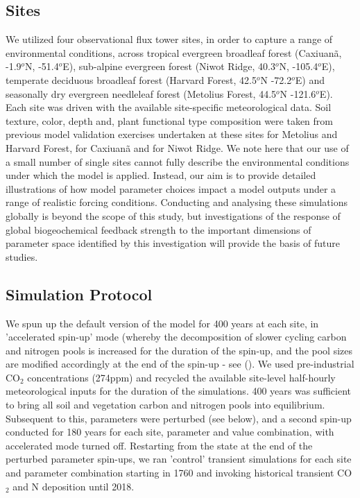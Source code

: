 \usepackage{}\documentclass[draft,linenumbers]{agujournal}
\begin{document}
\subsection{Sites}
We utilized four observational flux tower sites, in order to capture a range of environmental conditions, across tropical evergreen broadleaf forest (Caxiuan\~a, -1.9$^{o}$N, -51.4$^{o}$E),  sub-alpine evergreen forest (Niwot Ridge, 40.3$^{o}$N, -105.4$^{o}$E), temperate deciduous broadleaf forest (Harvard Forest, 42.5$^{o}$N -72.2$^{o}$E) and seasonally dry evergreen needleleaf forest (Metolius Forest, 44.5$^{o}$N -121.6$^{o}$E).  Each site was driven with the available site-specific meteorological data. Soil texture, color, depth and, plant functional type composition were taken from previous model validation exercises undertaken at these sites \cite{bonan2012} for Metolius and Harvard Forest, \cite{fisher2007} for Caxiuan\~a and \cite{bonan2013} for Niwot Ridge.   We note here that our use of a small number of single sites cannot fully describe the environmental conditions under which the model is applied. Instead, our aim is to provide detailed illustrations of how model parameter choices impact a model outputs under a range of realistic forcing conditions. Conducting and analysing these simulations globally is beyond the scope of this study, but investigations of the response of global biogeochemical feedback strength to the important dimensions of parameter space identified by this investigation will provide the basis of future studies. 

\subsection{Simulation Protocol}
We spun up the default version of the model for 400 years at each site, in 'accelerated spin-up' mode (whereby the decomposition of slower cycling carbon and nitrogen pools is increased for the duration of the spin-up, and the pool sizes are modified accordingly at the end of the spin-up - see (\cite{lawrence2018}). We used pre-industrial CO$_{2}$ concentrations (274ppm) and recycled the available site-level half-hourly meteorological inputs for the duration of the simulations. 400 years was sufficient to bring all soil and vegetation carbon and nitrogen pools into equilibrium. Subsequent to this, parameters were perturbed (see below), and a second spin-up conducted for 180 years for each site, parameter and value combination, with accelerated mode turned off. Restarting from the state at the end of the perturbed parameter spin-ups, we ran 'control' transient simulations for each site and parameter combination starting in 1760 and invoking historical transient CO$_{2}$ and N deposition until 2018.
\end{document}
